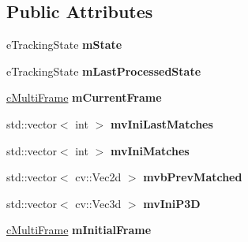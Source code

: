 \subsection*{Public Attributes}
\begin{DoxyCompactItemize}
\item 
e\+Tracking\+State {\bfseries m\+State}\hypertarget{classMultiColSLAM_1_1cTracking_a629542bc9c26abf1fee9e7b09a4d7ae5}{}\label{classMultiColSLAM_1_1cTracking_a629542bc9c26abf1fee9e7b09a4d7ae5}

\item 
e\+Tracking\+State {\bfseries m\+Last\+Processed\+State}\hypertarget{classMultiColSLAM_1_1cTracking_a20a1d17e6b4b8d4d909fc0f729cf5f17}{}\label{classMultiColSLAM_1_1cTracking_a20a1d17e6b4b8d4d909fc0f729cf5f17}

\item 
\hyperlink{classMultiColSLAM_1_1cMultiFrame}{c\+Multi\+Frame} {\bfseries m\+Current\+Frame}\hypertarget{classMultiColSLAM_1_1cTracking_a4a3df7e47f227f62902269993d98d985}{}\label{classMultiColSLAM_1_1cTracking_a4a3df7e47f227f62902269993d98d985}

\item 
std\+::vector$<$ int $>$ {\bfseries mv\+Ini\+Last\+Matches}\hypertarget{classMultiColSLAM_1_1cTracking_a5f87204631832c352613acbc1378c5a4}{}\label{classMultiColSLAM_1_1cTracking_a5f87204631832c352613acbc1378c5a4}

\item 
std\+::vector$<$ int $>$ {\bfseries mv\+Ini\+Matches}\hypertarget{classMultiColSLAM_1_1cTracking_a3d2fa711b01d884d8e725851cba63d3b}{}\label{classMultiColSLAM_1_1cTracking_a3d2fa711b01d884d8e725851cba63d3b}

\item 
std\+::vector$<$ cv\+::\+Vec2d $>$ {\bfseries mvb\+Prev\+Matched}\hypertarget{classMultiColSLAM_1_1cTracking_a79f14228c95eee96eca79b225545d522}{}\label{classMultiColSLAM_1_1cTracking_a79f14228c95eee96eca79b225545d522}

\item 
std\+::vector$<$ cv\+::\+Vec3d $>$ {\bfseries mv\+Ini\+P3D}\hypertarget{classMultiColSLAM_1_1cTracking_af9c04026ee74a90941907d86c2094342}{}\label{classMultiColSLAM_1_1cTracking_af9c04026ee74a90941907d86c2094342}

\item 
\hyperlink{classMultiColSLAM_1_1cMultiFrame}{c\+Multi\+Frame} {\bfseries m\+Initial\+Frame}\hypertarget{classMultiColSLAM_1_1cTracking_acb36066360b6f3c1c24cc9981da75529}{}\label{classMultiColSLAM_1_1cTracking_acb36066360b6f3c1c24cc9981da75529}


\end{DoxyCompactItemize}
